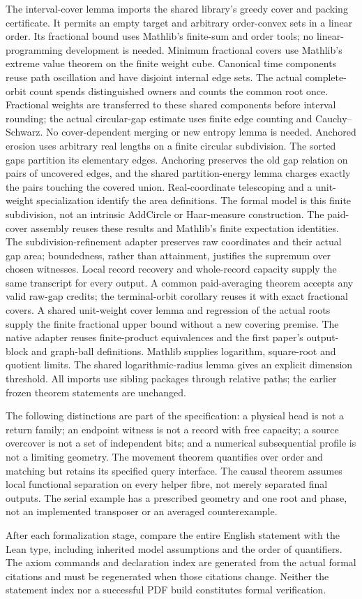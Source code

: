 The interval-cover lemma imports the shared library's greedy cover and
packing certificate. It permits an empty target and arbitrary order-convex
sets in a linear order. Its fractional bound uses Mathlib's finite-sum
and order tools; no linear-programming development is needed.
Minimum fractional covers use Mathlib's extreme value theorem on the
finite weight cube. Canonical time components reuse path oscillation and
have disjoint internal edge sets. The actual complete-orbit count spends
distinguished owners and counts the common root once. Fractional weights
are transferred to these shared components before interval rounding;
the actual circular-gap estimate uses finite edge counting and
Cauchy--Schwarz. No cover-dependent merging or new entropy lemma is needed.
Anchored erosion uses arbitrary real lengths on a finite circular subdivision.
The sorted gaps partition its elementary edges. Anchoring preserves the old
gap relation on pairs of uncovered edges, and the shared partition-energy
lemma charges exactly the pairs touching the covered union. Real-coordinate
telescoping and a unit-weight specialization identify the area definitions.
The formal model is this finite subdivision, not an intrinsic AddCircle
or Haar-measure construction.
The paid-cover assembly reuses these results and Mathlib's finite
expectation identities. The subdivision-refinement adapter preserves raw
coordinates and their actual gap area; boundedness, rather than attainment,
justifies the supremum over chosen witnesses. Local record recovery and
whole-record capacity supply the same transcript for every output.
A common paid-averaging theorem accepts any valid raw-gap credits;
the terminal-orbit corollary reuses it with exact fractional covers.
A shared unit-weight cover lemma and regression of the actual roots
supply the finite fractional upper bound without a new covering premise.
The native adapter reuses finite-product equivalences and the first paper's
output-block and graph-ball definitions. Mathlib supplies logarithm,
square-root and quotient limits. The shared logarithmic-radius lemma gives
an explicit dimension threshold. All imports use sibling packages through
relative paths; the earlier frozen theorem statements are unchanged.

The following distinctions are part of the specification: a physical
head is not a return family; an endpoint witness is not a record with
free capacity; a source overcover is not a set of independent bits;
and a numerical subsequential profile is not a limiting geometry.
The movement theorem quantifies over order and matching but retains
its specified query interface. The causal theorem assumes local
functional separation on every helper fibre, not merely separated
final outputs. The serial example has a prescribed geometry and one
root and phase, not an implemented transposer or an averaged
counterexample.

After each formalization stage, compare the entire English statement
with the Lean type, including inherited model assumptions and the
order of quantifiers. The axiom commands and declaration index are
generated from the actual formal citations and must be regenerated
when those citations change. Neither the statement index nor a
successful PDF build constitutes formal verification.
